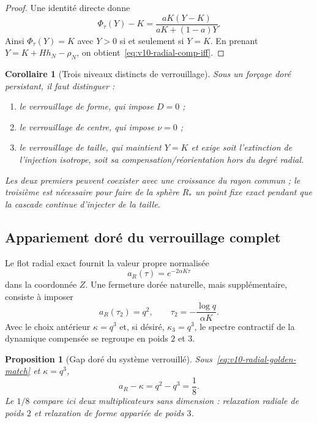 \documentclass[11pt,a4paper]{article}
\newtheorem{proposition}[theorem]{Proposition}
\newtheorem{corollary}[theorem]{Corollaire}
\begin{document}
\begin{proof}
Une identité directe donne
\begin{equation}\label{eq:v10-Phi-minus-K}
 \Phi_\tau(Y)-K
 =\frac{aK(Y-K)}{aK+(1-a)Y}.
\end{equation}
Ainsi $\Phi_\tau(Y)=K$ avec $Y>0$ si et seulement si $Y=K$. En prenant $Y=K+Hh_N-\rho_N$, on obtient~\eqref{eq:v10-radial-comp-iff}.
\end{proof}

\begin{corollary}[Trois niveaux distincts de verrouillage]\label{cor:v10-three-locks}
Sous un forçage doré persistant, il faut distinguer :
\begin{enumerate}[label=\textup{(\roman*)}]
\item le \emph{verrouillage de forme}, qui impose $D=0$ ;
\item le \emph{verrouillage de centre}, qui impose $\nu=0$ ;
\item le \emph{verrouillage de taille}, qui maintient $Y=K$ et exige soit l'extinction de l'injection isotrope, soit sa compensation/réorientation hors du degré radial.
\end{enumerate}
Les deux premiers peuvent coexister avec une croissance du rayon commun ; le troisième est nécessaire pour faire de la sphère $R_*$ un point fixe exact pendant que la cascade continue d'injecter de la taille.
\end{corollary}

\subsection{Appariement doré du verrouillage complet}

Le flot radial exact fournit la valeur propre normalisée
\begin{equation}\label{eq:v10-radial-multiplier}
 a_R(\tau)=e^{-2\alpha K\tau}
\end{equation}
dans la coordonnée $Z$. Une fermeture dorée naturelle, mais supplémentaire, consiste à imposer
\begin{equation}\label{eq:v10-radial-golden-match}
 \boxed{a_R(\tau_2)=q^2,\qquad
 \tau_2=-\frac{\log q}{\alpha K}.}
\end{equation}
Avec le choix antérieur $\kappa=q^3$ et, si désiré, $\kappa_3=q^3$, le spectre contractif de la dynamique compensée se regroupe en poids $2$ et $3$.

\begin{proposition}[Gap doré du système verrouillé]\label{prop:v10-full-golden-gap}
Sous~\eqref{eq:v10-radial-golden-match} et $\kappa=q^3$,
\begin{equation}\label{eq:v10-full-gap}
 \boxed{a_R-\kappa=q^2-q^3=\frac18.}
\end{equation}
Le $1/8$ compare ici deux multiplicateurs sans dimension : relaxation radiale de poids $2$ et relaxation de forme appariée de poids $3$.
\end{proposition}
\end{document}
